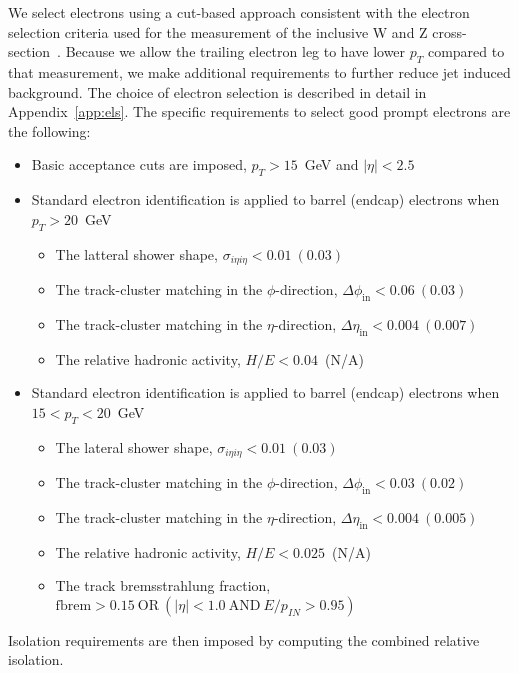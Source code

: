 We select electrons using a cut-based approach consistent with the electron 
selection criteria used for the measurement of the inclusive W and Z 
cross-section~\cite{VBTFCrossSectionNote}. 
Because we allow the trailing electron leg to have lower $p_T$ compared
to that measurement, we make additional requirements to further reduce
jet induced background.
The choice of electron selection is described in detail in Appendix~\ref{app:els}.
The specific requirements to select good prompt electrons are the following:

\begin{itemize}
    \item Basic acceptance cuts are imposed,  $p_T>15$~GeV and $|\eta| < 2.5$
    \item Standard electron identification is applied to barrel (endcap) electrons when $p_T>20$~GeV
    \begin{itemize}
        \item The latteral shower shape, $\sigma_{i\eta i\eta} < 0.01~(0.03)$
        \item The track-cluster matching in the $\phi$-direction, $\Delta \phi_{\mathrm{in}} < 0.06~(0.03)$
        \item The track-cluster matching in the $\eta$-direction, $\Delta \eta_{\mathrm{in}} < 0.004~(0.007)$
        \item The relative hadronic activity, $H/E<0.04$~(N/A)
    \end{itemize}
    \item Standard electron identification is applied to barrel (endcap) electrons when $15<p_T<20$~GeV
    \begin{itemize}
        \item The lateral shower shape, $\sigma_{i\eta i\eta} < 0.01~(0.03)$
        \item The track-cluster matching in the $\phi$-direction, $\Delta \phi_{\mathrm{in}} < 0.03~(0.02)$
        \item The track-cluster matching in the $\eta$-direction, $\Delta \eta_{\mathrm{in}} < 0.004~(0.005)$
        \item The relative hadronic activity, $H/E<0.025$~(N/A)
        \item The track bremsstrahlung fraction, $\mathrm{fbrem}>0.15~\mathrm{OR}~(|\eta|<1.0~\mathrm{AND}~E/p_{IN}>0.95)$
    \end{itemize}
\end{itemize}

Isolation requirements are then imposed by computing the combined relative isolation.

